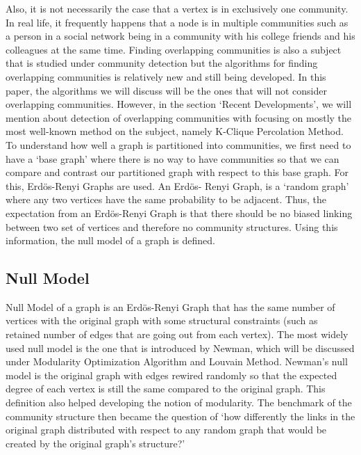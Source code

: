 \documentclass[10pt]{article}
\begin{document}
Also, it is not necessarily the case that a vertex is in exclusively one community. In real life, it frequently happens that a node is in multiple communities such as a person in a social network being in a community with his college friends and his colleagues at the same time. Finding overlapping communities is also a subject that is studied under community detection but the algorithms for finding overlapping communities is relatively new and still being developed. In this paper, the algorithms we will discuss will be the ones that will not consider overlapping communities. However, in the section ‘Recent Developments’, we will mention about detection of overlapping communities with focusing on mostly the most well-known method on the subject, namely K-Clique Percolation Method. \\

To understand how well a graph is partitioned into communities, we first need to have a ‘base graph’ where there is no way to have communities so that we can compare and contrast our partitioned graph with respect to this base graph. For this, Erdös-Renyi Graphs are used. An Erdös- Renyi Graph, is a ‘random graph’ where any two vertices have the same probability to be adjacent\cite{erdos}. Thus, the expectation from an Erdös-Renyi Graph is that there should be no biased linking between two set of vertices and therefore no community structures. Using this information, the null model of a graph is defined. \\

\subsection{Null Model}

Null Model of a graph is an Erdös-Renyi Graph that has the same number of vertices with the original graph with some structural constraints (such as retained number of edges that are going out from each vertex). The most widely used null model is the one that is introduced by Newman, which will be discussed under Modularity Optimization Algorithm and Louvain Method.
Newman’s null model is the original graph with edges rewired randomly so that the expected degree of each vertex is still the same compared to the original graph. This definition also helped developing the notion of modularity. The benchmark of the community structure then became the question of ‘how differently the links in the original graph distributed with respect to any random graph that would be created by the original graph’s structure?’ \\
\end{document}
